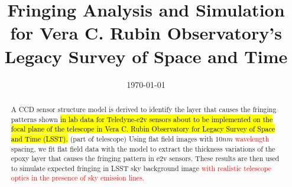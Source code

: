 \documentclass[twocolumn]{aastex63} %
\date{\today}
\begin{document}
\begin{CJK*}{UTF8}{gbsn}
\title{Fringing Analysis and Simulation for Vera C. Rubin Observatory's Legacy Survey of Space and Time} 



\begin{abstract}
A CCD sensor structure model is derived to identify the layer that causes the fringing patterns shown \hl {in lab data for Teledyne-e2v sensors about to be implemented on the focal plane of the telescope in  Vera C. Rubin Observatory for Legacy Survey of Space and Time (LSST).} (part of telescope) Using flat field images with $10 nm$ \textcolor{red}{wavelength} spacing, we fit flat field data with the model to extract the thickness variations of the epoxy layer that causes the fringing pattern in e2v sensors. These results are then used to simulate expected fringing in LSST sky background image \textcolor{red} {with realistic telescope optics in the presence of sky emission lines.}
\end{abstract}



\end{CJK*}
\end{document}
